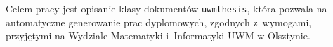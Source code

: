 \begin{streszczenie}
Celem pracy jest opisanie klasy dokumentów \texttt{uwmthesis}, która pozwala na automatyczne generowanie prac dyplomowych, zgodnych z~wymogami, przyjętymi na Wydziale Matematyki i~Informatyki UWM w Olsztynie.
\end{streszczenie}

\begin{abstract}
The purpose of this document is to present the \texttt{uwmthesis} \LaTeX\ document class. This document class can be used for generation of theses on the Faculty of Mathematics and Computer Science of the UWM in Olsztyn.
\end{abstract}